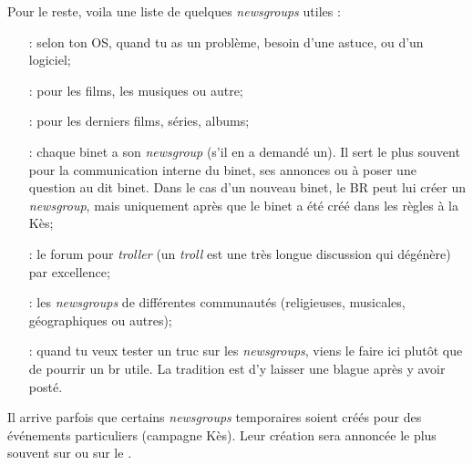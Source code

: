 Pour le reste, voila une liste de quelques \emph{newsgroups} utiles :
\begin{itemize}

\item[\ngname{br.informatique.windows/linux/mac} :] selon ton OS, quand tu as un probl\`eme, besoin d'une astuce, ou d'un logiciel;

\item[\ngname{br.informatique.media.request.*} :] pour les films, les musiques ou autre;

\item[\ngname{br.informatique.media.nouveautes} :] pour les derniers films, s\'eries, albums;

\item[\ngname{br.binet.ton\_binet} :] chaque binet a son \emph{newsgroup} (s'il en a demand\'e un). Il sert le plus souvent pour la communication interne du binet, ses annonces ou \`a  poser une question au dit binet. Dans le cas d'un nouveau binet, le BR peut lui cr\'eer un \emph{newsgroup}, mais uniquement apr\`es que le binet a \'et\'e cr\'e\'e dans les r\`egles \`a  la K\`es;

\item[\ngname{br.binet.polemix} :] le forum pour \emph{troller} (un \emph{troll} est une tr\`es longue discussion qui d\'eg\'en\`ere) par excellence;
                          
\item[\ngname{br.communaut\'e.*} :] les \emph{newsgroups} de diff\'erentes communaut\'es (religieuses, musicales, g\'eographiques ou autres);

\item[\ngname{br.test} :] quand tu veux tester un truc sur les \emph{newsgroups}, viens le faire ici plut\^ot que de pourrir un br utile. La tradition est d'y laisser une blague apr\`es y avoir post\'e.

\end{itemize}


Il arrive parfois que certains \emph{newsgroups} temporaires soient cr\'e\'es pour des \'ev\'enements particuliers (campagne K\`es). Leur cr\'eation sera annonc\'ee
le plus souvent sur \fkz ou sur le .

